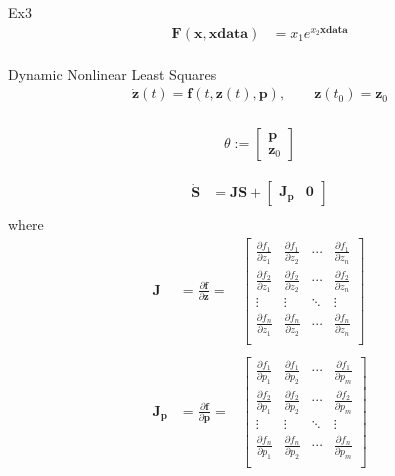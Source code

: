 \documentclass{article}
\begin{document}
Ex3
\begin{align*}
\mathbf{F} \left(\mathbf{x},\mathbf{xdata}\right) &= x_1 e^{x_2 \mathbf{xdata}}\\
\end{align*}

Dynamic Nonlinear Least Squares
\begin{align*}
\dot{\mathbf{z}}(t) = \mathbf{f} \left( t,  \mathbf{z}(t), \mathbf{p} \right), \qquad \mathbf{z}(t_0) = \mathbf{z}_0\\
\end{align*}

\begin{align*}
\theta := \begin{bmatrix} \mathbf{p}\\ \mathbf{z}_0 \end{bmatrix}
\end{align*}

\begin{align*}
\dot{\mathbf{S}} &= \mathbf{J} \mathbf{S} + \begin{bmatrix} \mathbf{J_p} & \mathbf{0} \end{bmatrix}\\
\end{align*}
where
\begin{align*}
\mathbf{J} &= \frac{\partial \mathbf{f}}{\partial \mathbf{z}} =
            &\begin{bmatrix}
            \frac{\partial f_1}{\partial z_1} & \frac{\partial f_1}{\partial z_2} & \cdots & \frac{\partial f_1}{\partial z_n}\\
            \frac{\partial f_2}{\partial z_1} & \frac{\partial f_2}{\partial z_2} & \cdots & \frac{\partial f_2}{\partial z_n}\\
            \vdots & \vdots & \ddots & \vdots\\
            \frac{\partial f_n}{\partial z_1} & \frac{\partial f_n}{\partial z_2} & \cdots & \frac{\partial f_n}{\partial z_n}\\
            \end{bmatrix}\\
            &\\
\mathbf{J_p} &= \frac{\partial \mathbf{f}}{\partial \mathbf{p}} =
            &\begin{bmatrix}
            \frac{\partial f_1}{\partial p_1} & \frac{\partial f_1}{\partial p_2} & \cdots & \frac{\partial f_1}{\partial p_m}\\
            \frac{\partial f_2}{\partial p_1} & \frac{\partial f_2}{\partial p_2} & \cdots & \frac{\partial f_2}{\partial p_m}\\
            \vdots & \vdots & \ddots & \vdots\\
            \frac{\partial f_n}{\partial p_1} & \frac{\partial f_n}{\partial p_2} & \cdots & \frac{\partial f_n}{\partial p_m}\\
            \end{bmatrix}\\
\end{align*}
\end{document}

